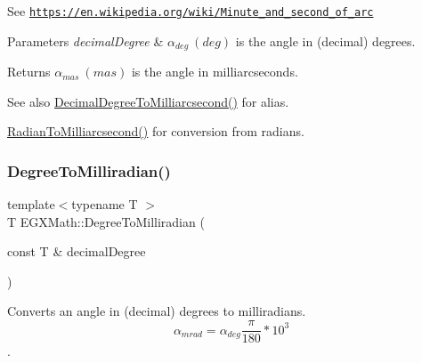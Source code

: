 See \href{https://en.wikipedia.org/wiki/Minute_and_second_of_arc}{\tt https\+://en.\+wikipedia.\+org/wiki/\+Minute\+\_\+and\+\_\+second\+\_\+of\+\_\+arc} 
\begin{DoxyParams}{Parameters}
{\em decimal\+Degree} & $\alpha_{deg}\ (deg)$ is the angle in (decimal) degrees. \\
\hline
\end{DoxyParams}
\begin{DoxyReturn}{Returns}
$\alpha_{mas}\ (mas)$ is the angle in milliarcseconds. 
\end{DoxyReturn}
\begin{DoxySeeAlso}{See also}
\mbox{\hyperlink{group___e_g_x_math-_angle_conversions-_decimal_degree_gadb9ff3c92cf7484793f91e7de80c222e}{Decimal\+Degree\+To\+Milliarcsecond()}} for alias. 

\mbox{\hyperlink{group___e_g_x_math-_angle_conversions-_radian_ga84fbb494a455cfeb30be62776f96c9a9}{Radian\+To\+Milliarcsecond()}} for conversion from radians. 
\end{DoxySeeAlso}
\mbox{\label{group___e_g_x_math-_angle_conversions-_degree_gae4fa6c2d3805430760783650cfbfdb11}} 
\subsubsection{\texorpdfstring{Degree\+To\+Milliradian()}{DegreeToMilliradian()}}
{\footnotesize\ttfamily template$<$typename T $>$ \\
T E\+G\+X\+Math\+::\+Degree\+To\+Milliradian (\begin{DoxyParamCaption}\item[{const T \&}]{decimal\+Degree }\end{DoxyParamCaption})}



Converts an angle in (decimal) degrees to milliradians. \[\alpha_{mrad}=\alpha_{deg}\frac{\pi}{180}*10^3\]. 

